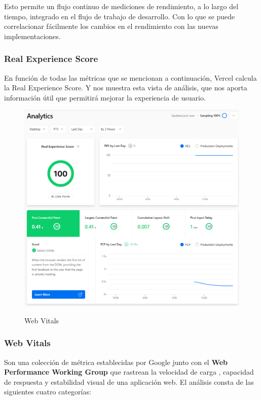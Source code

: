 \documentclass[12pt,twoside,titlepage]{report}
\begin{document}
Esto permite un flujo continuo de mediciones de rendimiento, a lo largo del tiempo, integrado en el flujo de trabajo de desarrollo. Con lo que se puede correlacionar fácilmente los cambios en el rendimiento con las nuevas implementaciones.

\subsubsection{Real Experience Score}

En función de todas las métricas que se mencionan a continuación, Vercel calcula la Real Experience Score. Y nos muestra esta vista de análisis, que nos aporta información útil que permitirá mejorar la experiencia de usuario.

\begin{figure}[H]
    \centering
    \includegraphics[scale=0.5]{Vercel/RealExperienceScore}
    \label{fig:Vercel_metrics}
    \caption{Web Vitals}
\end{figure}

\subsubsection{Web Vitals}

Son una colección de métrica establecidas por Google \cite{webdev} junto con el \textbf{Web Performance Working Group} \cite{w3} que rastrean la velocidad de carga , capacidad de respuesta y estabilidad visual de una aplicación web. El análisis consta de las siguientes cuatro categorías:
\end{document}

